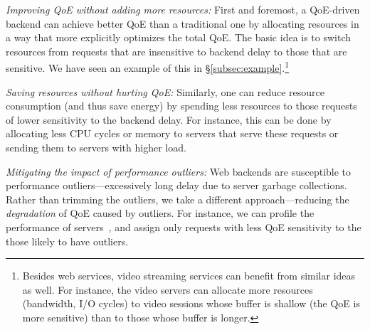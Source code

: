 \begin{packeditemize}
\item{\em Improving QoE without adding more resources:} 
First and foremost, a QoE-driven backend can achieve better QoE than a traditional one by allocating resources in a way that more explicitly optimizes the total QoE. 
The basic idea is to switch resources from requests that are insensitive to backend delay to those that are sensitive.
We have seen an example of this in \S\ref{subsec:example}.\footnote{Besides web services, video streaming services can benefit from similar ideas as well. For instance, the video servers can allocate more resources (\eg bandwidth, I/O cycles) to video sessions whose buffer is shallow (\ie the QoE is more sensitive) than to those whose buffer is longer.}

\item{\em Saving resources without hurting QoE:}
Similarly, one can reduce resource consumption (and thus save energy) by spending less resources to those requests of lower sensitivity to the backend delay. For instance, this can be done by allocating less CPU cycles or memory to servers that serve these requests or sending them to servers with higher load.

\item{\em Mitigating the impact of performance outliers:} 
Web backends are susceptible to performance outliers---excessively long delay due to \eg server garbage collections. 
Rather than trimming the outliers, we take a different approach---reducing the {\em degradation} of QoE caused by outliers.
For instance, we can profile the performance of servers~\cite{yadwadkar2014wrangler}, and assign only requests with less QoE sensitivity to the those likely to have outliers. 
    
\end{packeditemize}

